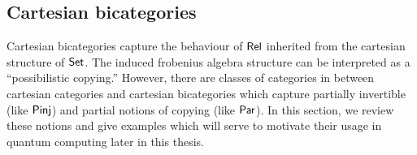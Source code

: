\subsection{Cartesian bicategories}


\label{sec:rest}

Cartesian bicategories capture the behaviour of $\mathsf{Rel}$ inherited from the cartesian structure of $\mathsf{Set}$.  The induced frobenius algebra structure can be interpreted as a ``possibilistic copying.'' However, there are classes of categories in between cartesian categories and cartesian bicategories which capture partially invertible (like $\mathsf{Pinj}$) and partial notions of copying (like $\mathsf{Par}$).  In this section, we review these notions and give examples which will serve to motivate their usage in quantum computing later in this thesis.




